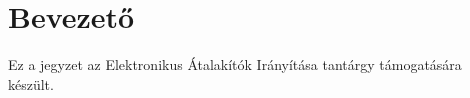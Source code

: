 \section{Bevezető}
\vspace{4cm}

Ez a jegyzet az Elektronikus Átalakítók Irányítása tantárgy támogatására készült.


\vspace{-1.5mm}
\newpage